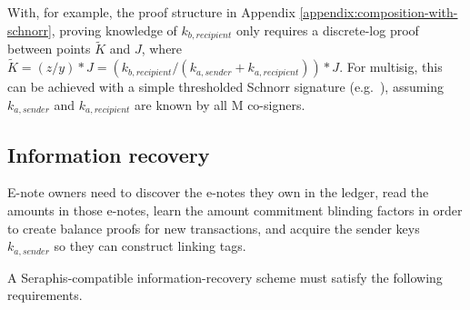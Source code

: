 \begin{itemize}
    With, for example, the proof structure in Appendix \ref{appendix:composition-with-schnorr}, proving knowledge of $k_{b, recipient}$ only requires a discrete-log proof between points $\tilde{K}$ and $J$, where $\tilde{K} = (z/y)*J = (k_{b, recipient}/(k_{a, sender} + k_{a, recipient}))*J$. For multisig, this can be achieved with a simple thresholded Schnorr signature (e.g.\ \cite{...}), assuming $k_{a, sender}$ and $k_{a, recipient}$ are known by all M co-signers.
\end{itemize}


\subsection{Information recovery}
\label{subsec:seraphis-information-recovery}

E-note owners need to discover the e-notes they own in the ledger, read the amounts in those e-notes, learn the amount commitment blinding factors in order to create balance proofs for new transactions, and acquire the sender keys $k_{a,sender}$ so they can construct linking tags.

A Seraphis-compatible information-recovery scheme must satisfy the following requirements.

